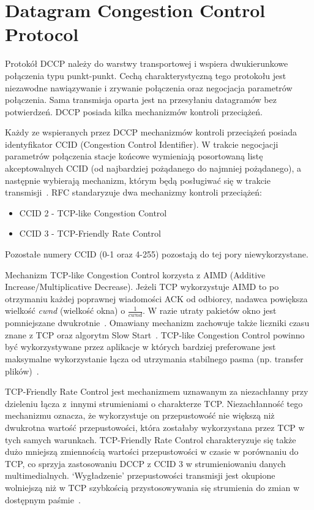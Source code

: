 \section{Datagram Congestion Control Protocol}
\label{sec:DCCP}

Protokół DCCP należy do warstwy transportowej i wspiera dwukierunkowe połączenia typu punkt-punkt. Cechą charakterystyczną tego protokołu jest niezawodne nawiązywanie i zrywanie połączenia oraz negocjacja parametrów połączenia. Sama transmisja oparta jest na przesyłaniu datagramów bez potwierdzeń. DCCP posiada kilka mechanizmów kontroli przeciążeń.

Każdy ze wspieranych przez DCCP mechanizmów kontroli przeciążeń posiada identyfikator CCID (Congestion Control Identifier). W trakcie negocjacji parametrów połączenia stacje końcowe wymieniają posortowaną listę akceptowalnych CCID (od najbardziej pożądanego do najmniej pożądanego), a następnie wybierają mechanizm, którym będą posługiwać się w trakcie transmisji~\cite{RFC5762}. RFC standaryzuje dwa mechanizmy kontroli przeciążeń:
\begin{itemize}
  \item CCID 2 - TCP-like Congestion Control
  \item CCID 3 - TCP-Friendly Rate Control
\end{itemize}
Pozostałe numery CCID (0-1 oraz 4-255) pozostają do tej pory niewykorzystane.

Mechanizm TCP-like Congestion Control korzysta z AIMD (Additive Increase/Multiplicative Decrease). Jeżeli TCP wykorzystuje AIMD to po otrzymaniu każdej poprawnej wiadomości ACK od odbiorcy, nadawca powiększa wielkość \textit{cwnd} (wielkość okna) o $\frac{1}{cwnd}$. W razie utraty pakietów okno jest pomniejszane dwukrotnie~\cite{Stevens}. Omawiany mechanizm zachowuje także liczniki czasu znane z TCP oraz algorytm Slow Start~\cite{RFC2581}. TCP-like Congestion Control powinno być wykorzystywane przez aplikacje w których bardziej preferowane jest maksymalne wykorzystanie łącza od utrzymania stabilnego pasma (np. transfer plików)~\cite{RFC4341}.

TCP-Friendly Rate Control jest mechanizmem uznawanym za niezachłanny przy dzieleniu łącza z~innymi strumieniami o charakterze TCP. Niezachłanność tego mechanizmu oznacza, że wykorzystuje on przepustowość nie większą niż dwukrotna wartość przepustowości, która zostałaby wykorzystana przez TCP w tych samych warunkach. TCP-Friendly Rate Control charakteryzuje się także dużo mniejszą zmiennością wartości przepustowości w czasie w porównaniu do TCP, co sprzyja zastosowaniu DCCP z CCID 3 w strumieniowaniu danych multimedialnych. `Wygładzenie' przepustowości transmisji jest okupione wolniejszą niż w TCP szybkością przystosowywania się strumienia do zmian w dostępnym paśmie~\cite{RFC5348}.


